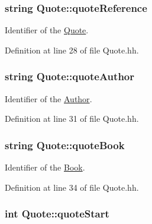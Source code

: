 \subsubsection[{\texorpdfstring{quote\+Reference}{quoteReference}}]{\setlength{\rightskip}{0pt plus 5cm}string Quote\+::quote\+Reference\hspace{0.3cm}{\ttfamily [private]}}\hypertarget{class_quote_a9c7b2deff2ee9a0a216c360fe304202a}{}\label{class_quote_a9c7b2deff2ee9a0a216c360fe304202a}


Identifier of the \hyperlink{class_quote}{Quote}. 



Definition at line 28 of file Quote.\+hh.

\subsubsection[{\texorpdfstring{quote\+Author}{quoteAuthor}}]{\setlength{\rightskip}{0pt plus 5cm}string Quote\+::quote\+Author\hspace{0.3cm}{\ttfamily [private]}}\hypertarget{class_quote_a930113c4ee0ae5e5506bbc1ea3e79b49}{}\label{class_quote_a930113c4ee0ae5e5506bbc1ea3e79b49}


Identifier of the \hyperlink{class_author}{Author}. 



Definition at line 31 of file Quote.\+hh.

\subsubsection[{\texorpdfstring{quote\+Book}{quoteBook}}]{\setlength{\rightskip}{0pt plus 5cm}string Quote\+::quote\+Book\hspace{0.3cm}{\ttfamily [private]}}\hypertarget{class_quote_a7e6968e086bdd45b40627a37ecbbf6fc}{}\label{class_quote_a7e6968e086bdd45b40627a37ecbbf6fc}


Identifier of the \hyperlink{class_book}{Book}. 



Definition at line 34 of file Quote.\+hh.

\subsubsection[{\texorpdfstring{quote\+Start}{quoteStart}}]{\setlength{\rightskip}{0pt plus 5cm}int Quote\+::quote\+Start\hspace{0.3cm}{\ttfamily [private]}}\hypertarget{class_quote_ac426122ac24638740b2a5c5e8342e8c9}{}\label{class_quote_ac426122ac24638740b2a5c5e8342e8c9}


